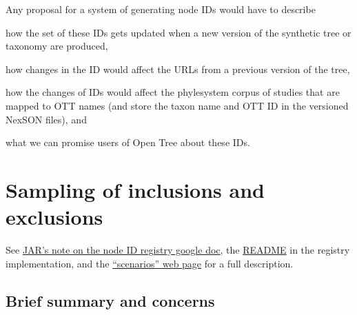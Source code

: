 \documentclass[11pt]{article}
\begin{document}
Any proposal for a system of generating node IDs would have to describe
\begin{compactenum}
  \item how the
    set of these IDs gets updated when a new version of the synthetic tree or taxonomy are produced,
  \item how changes in the ID would affect the URLs from a previous version of the tree, 
  \item how the changes of IDs would affect the phylesystem corpus of studies that 
  are mapped to OTT names (and store the taxon name and OTT ID in the versioned NexSON
  files), and
  \item what we can promise users of Open Tree about these IDs.
\end{compactenum}

\section{Sampling of inclusions and exclusions}
See \href{https://docs.google.com/document/d/1hJHjMckLywnoBuY1xG3I0hP-rsl4l8du3iA8kflEOQE/edit#}{JAR's note on the node ID registry google doc}, the 
\href{https://github.com/OpenTreeOfLife/reference-taxonomy/blob/registry/registry/README.md}{README} in the registry implementation,
and the \href{https://rawgit.com/OpenTreeOfLife/reference-taxonomy/registry/registry/doc/scenarios.html}{``scenarios'' web page} for 
a full description.
\subsection{Brief summary and concerns}
\end{document}
